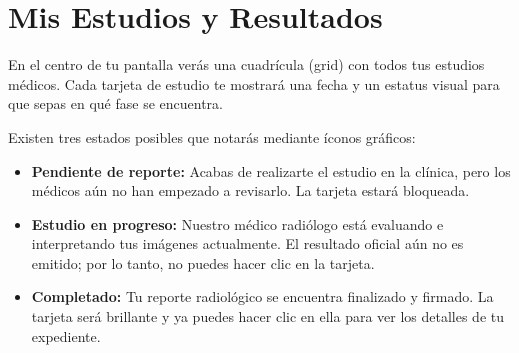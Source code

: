 \section{Mis Estudios y Resultados}
En el centro de tu pantalla verás una cuadrícula (grid) con todos tus estudios médicos. Cada tarjeta de estudio te mostrará una fecha y un estatus visual para que sepas en qué fase se encuentra.

Existen tres estados posibles que notarás mediante íconos gráficos:
\begin{itemize}
    \item \textbf{Pendiente de reporte:} Acabas de realizarte el estudio en la clínica, pero los médicos aún no han empezado a revisarlo. La tarjeta estará bloqueada.
    \item \textbf{Estudio en progreso:} Nuestro médico radiólogo está evaluando e interpretando tus imágenes actualmente. El resultado oficial aún no es emitido; por lo tanto, no puedes hacer clic en la tarjeta.
    \item \textbf{Completado:} Tu reporte radiológico se encuentra finalizado y firmado. La tarjeta será brillante y ya puedes hacer clic en ella para ver los detalles de tu expediente.
\end{itemize}

